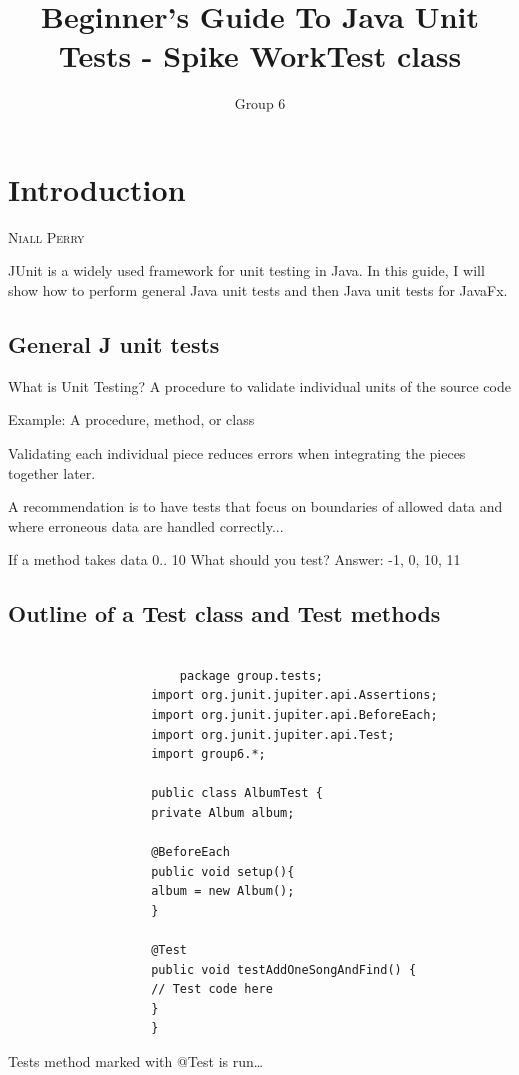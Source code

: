 \documentclass[a4paper]{report}
\title{Beginner's Guide To Java Unit Tests - Spike Work}
\author{Group 6}
\makeatletter
\newcommand{\chapterauthor}[1]{%
	{\parindent0pt\vspace*{-25pt}%
		\linespread{1.1}\large\scshape#1%
		\par\nobreak\vspace*{25pt}}
	\@afterheading%
}
\makeatother
\begin{document}
	\maketitle
	\tableofcontents
	\newpage
	
	\chapter{Introduction}\label{chap:Java Unit Tests}
	\chapterauthor{Niall Perry}

JUnit is a widely used framework for unit testing in Java. In this guide, I will show how to perform general Java unit tests and then Java unit tests for JavaFx.

\section{General J unit tests}\label{sec:introduction}
        What is Unit Testing?
A procedure to validate individual units of the source code

Example: A procedure, method, or class

Validating each individual piece reduces errors when integrating the pieces together later.

A recommendation is to have tests that focus on
boundaries of allowed data and where erroneous data are handled correctly...

If a method takes data 0.. 10 What should you test?
Answer: -1, 0, 10, 11


	\section{Outline of a Test class and Test methods}\label{chap:Test Class}
	\title{Test class}
\begin{lstlisting}
    
                        package group.tests;
                    import org.junit.jupiter.api.Assertions;
                    import org.junit.jupiter.api.BeforeEach;
                    import org.junit.jupiter.api.Test;
                    import group6.*;
                    
                    public class AlbumTest {
                    private Album album;
                    
                    @BeforeEach
                    public void setup(){
                    album = new Album();
                    }
                    
                    @Test
                    public void testAddOneSongAndFind() {
                    // Test code here
                    }
                    }
\end{lstlisting}
Tests method marked with @Test is run…
\end{document}
